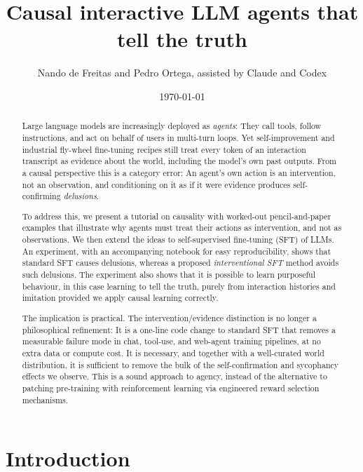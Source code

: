\documentclass[11pt]{article}
\title{\textbf{Causal interactive LLM agents that tell the truth}}
\author{Nando de Freitas and Pedro Ortega, assisted by Claude and Codex}
\date{\today}
\begin{document}
\maketitle

\begin{abstract}
Large language models are increasingly deployed as \emph{agents}: They call tools, follow instructions, and act on behalf of users in multi-turn loops. Yet self-improvement and industrial fly-wheel fine-tuning recipes still treat every token of an interaction transcript as evidence about the world, including the model's own past outputs. From a causal perspective this is a category error: An agent's own action is an intervention, not an observation, and conditioning on it as if it were evidence produces self-confirming \emph{delusions}.

To address this, we present a tutorial on causality with worked-out pencil-and-paper examples that illustrate why agents must treat their actions as intervention, and not as observations. We then extend the ideas to self-supervised fine-tuning (SFT) of LLMs. An experiment, with an accompanying notebook for easy reproducibility, shows that standard SFT causes delusions, whereas a proposed \emph{interventional SFT} method avoids such delusions. The experiment also shows that it is possible to learn purposeful behaviour, in this case learning to tell the truth, purely from interaction histories and imitation provided we apply causal learning correctly. 

The implication is practical. The intervention/evidence distinction is no longer a philosophical refinement: It is a one-line code change to standard SFT that removes a measurable failure mode in chat, tool-use, and web-agent training pipelines, at no extra data or compute cost. It is necessary, and together with a well-curated world distribution, it is sufficient to remove the bulk of the self-confirmation and sycophancy effects we observe. This is a sound approach to agency, instead of the alternative to patching pre-training with reinforcement learning via engineered reward selection mechanisms.
\end{abstract}










\section*{Introduction}
\end{document}
